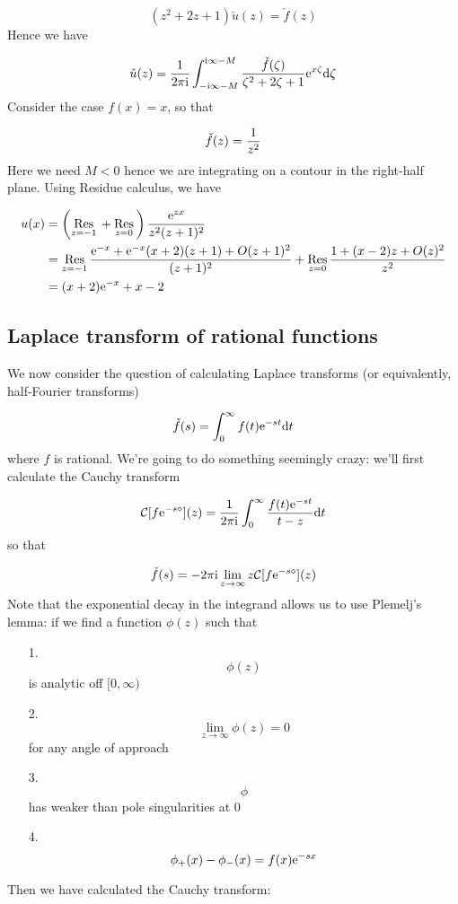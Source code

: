 \documentclass[12pt,landscape]{article}
\def\D{ {\rm d} }
\def\I{ {\rm i} }
\def\E{ {\rm e} }
\def\CC{ {\cal C} }
\def\Res_#1{\underset{#1}{\rm Res}\,}
\begin{document}
{\[
(z^2 + 2z + 1) \check u(z) = \check f(z)
\]
Hence we have

\[
\check u(z) = {1 \over 2 \pi \I}\int_{-\I\infty-M}^{\I \infty-M} {\check f(\zeta) \over \zeta^2 + 2\zeta+1} \E^{x \zeta} \D \zeta
\]
Consider the case $f(x) = x$, so that

\[
\check f(z) = {1 \over z^2}
\]
Here we need $M < 0$ hence we are integrating on a contour in the right-half plane.  Using Residue calculus, we have


\begin{align*}
u(x) &= \left(\Res_{z = -1} + \Res_{z=0}\right) {\E^{z x} \over z^2 (z +1)^2} \\
&= \Res_{z = -1}  {\E^{-x} +\E^{-x}(x+2) (z+1) +O(z+1)^2 \over  (z +1)^2} + \Res_{z=0} {1 + (x-2) z +O(z)^2 \over  z^2}  \\
 &= (x+2)\E^{-x} + x-2
 \end{align*}
\subsection{Laplace transform of rational functions}
We now consider the question of calculating Laplace transforms (or equivalently, half-Fourier transforms)

\[
\check f(s) = \int_0^\infty f(t) \E^{-s t} \D t
\]
where $f$ is rational. We're going to do something seemingly crazy: we'll first calculate the Cauchy transform

\[
\CC[f \E^{-s \diamond}](z) = {1 \over 2 \pi \I} \int_0^\infty {f(t) \E^{-s t} \over t- z} \D t
\]
so that

\[
\check f(s) = -2 \pi \I\lim_{z \rightarrow \infty}  z \CC[f \E^{-s \diamond}](z)
\]
Note that the exponential decay in the integrand allows us to use Plemelj's lemma: if we find a function $\phi(z)$ such that

\begin{itemize}
\item[1. ] \[
\phi(z)
\]
is analytic off $[0,\infty)$


\item[2. ] \[
\lim_{z \rightarrow \infty} \phi(z) = 0
\]
for any angle of approach


\item[3. ] \[
\phi
\]
has weaker than pole singularities at 0


\item[4. ] \[
\phi_+(x) - \phi_-(x) = f(x) \E^{-s x}
\]
\end{itemize}
Then we have calculated the Cauchy transform:

}
\end{document}

